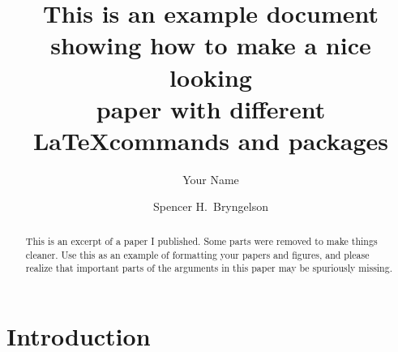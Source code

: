 \documentclass[11pt,sort&compress]{elsarticle}
\begin{document}
\hypersetup{
  linkcolor=darkrust,
  citecolor=seagreen,
  urlcolor=darkrust,
  pdfauthor=author,
}

\begin{frontmatter}

\title{{\large\bfseries This is an example document showing how to make a nice looking \\ paper with different \LaTeX commands and packages}}

\author[1]{Your Name}
\author[2,3]{Spencer H.\ Bryngelson}

\address[1]{Some other Department, The University of Texas at Austin, Austin, TX 78712, USA\vspace{-0.15cm}}
\address[2]{Walker Department of Mechanical Engineering, The University of Texas at Austin, Austin, TX 78712, USA\vspace{-0.15cm}}
\address[3]{Oden Institute for Computational Engineering and Sciences, The University of Texas at Austin, Austin, TX 78712, USA}

\date{}

\end{frontmatter}

\begin{abstract}
    This is an excerpt of a paper I published.
    Some parts were removed to make things cleaner.
    Use this as an example of formatting your papers and figures, and please realize that important parts of the arguments in this paper may be spuriously missing.
\end{abstract}

\section{Introduction}
\end{document}
